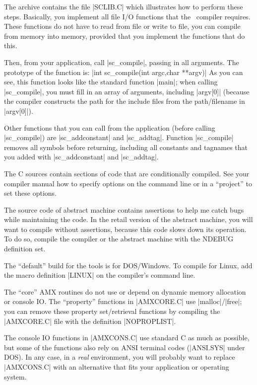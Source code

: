 The archive contains the file |SCLIB.C| which illustrates how to perform these
steps. Basically, you implement all file I/O functions that the \Small\ compiler
requires. These functions do not have to read from file or write to file, you
can compile from memory into memory, provided that you implement the functions
that do this.

Then, from your application, call |sc_compile|, passing in all arguments.
The prototype of the function is: \lbreak
\tabto 40pt |int sc_compile(int argc,char **argv)| \lbreak
As you can see, this function looks like the standard function |main|; when calling
|sc_compile|, you must fill in an array of arguments, including |argv[0]|
(because the compiler constructs the path for the include files from the
path\slash filename in |argv[0]|).

Other functions that you can call from the application (before calling
|sc_compile|) are |sc_addconstant| and |sc_addtag|. Function |sc_compile|
removes all symbols before returning, including all constants and tagnames
that you added with |sc_addconstant| and |sc_addtag|.


The C sources contain sections of code that are conditionally compiled. See
your compiler manual how to specify options on the command line or in a
``project'' to set these options.

The source code of abstract machine contains assertions to help me catch bugs
while maintaining the code. In the retail version of the abstract machine, you
will want to compile without assertions, because this code slows down its
operation. To do so, compile the compiler or the abstract machine with the
NDEBUG definition set.

The ``default'' build for the tools is for DOS/Windows. To compile for Linux,
add the macro definition |LINUX| on the compiler's command line.

The ``core'' AMX routines do not use or depend on dynamic memory allocation or
console IO. The ``property'' functions in |AMXCORE.C| use |malloc|\slash |free|; you
can remove these property set/retrieval functions by compiling the |AMXCORE.C|
file with the definition |NOPROPLIST|.

The console IO functions in |AMXCONS.C| use standard C as much as
possible, but some of the functions also rely on ANSI terminal codes (|ANSI.SYS|
under DOS). In any case, in a {\it real\/} environment, you will probably want to
replace |AMXCONS.C| with an alternative that fits your application or operating
system.

